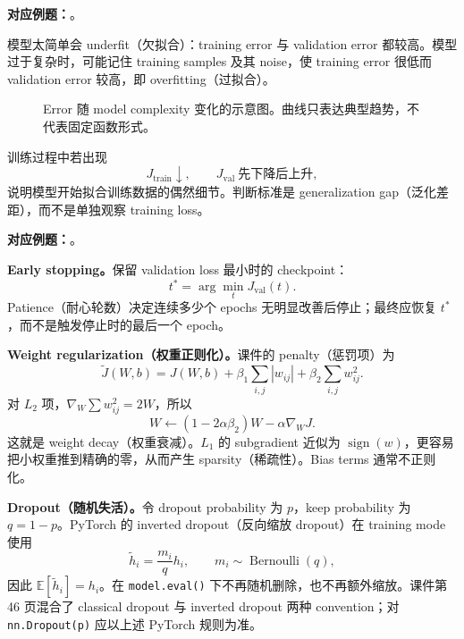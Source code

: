 \textbf{对应例题：}。


模型太简单会 underfit（欠拟合）：training error 与 validation error 都较高。模型过于复杂时，可能记住 training samples 及其 noise，使 training error 很低而 validation error 较高，即 overfitting（过拟合）。

\begin{figure}[htbp]
  \centering
  \resizebox{0.78\textwidth}{!}{}
  \caption{Error 随 model complexity 变化的示意图。曲线只表达典型趋势，不代表固定函数形式。}
  \label{fig:sc4001-l05-complexity-errors}
\end{figure}

训练过程中若出现
\[
  J_{\mathrm{train}}\downarrow,
  \qquad
  J_{\mathrm{val}}\ \text{先下降后上升},
\]
说明模型开始拟合训练数据的偶然细节。判断标准是 generalization gap（泛化差距），而不是单独观察 training loss。

\textbf{对应例题：}。


\textbf{Early stopping。}保留 validation loss 最小时的 checkpoint：
\[
  t^*=\arg\min_t J_{\mathrm{val}}(t).
\]
Patience（耐心轮数）决定连续多少个 epochs 无明显改善后停止；最终应恢复 $t^*$，而不是触发停止时的最后一个 epoch。

\textbf{Weight regularization（权重正则化）。}课件的 penalty（惩罚项）为
\[
  \widetilde J(W,b)
  =J(W,b)
  +\beta_1\sum_{i,j}|w_{ij}|
  +\beta_2\sum_{i,j}w_{ij}^2.
\]
对 $L_2$ 项，$\nabla_W\sum w_{ij}^2=2W$，所以
\[
  W\leftarrow
  (1-2\alpha\beta_2)W-\alpha\nabla_WJ.
\]
这就是 weight decay（权重衰减）。$L_1$ 的 subgradient 近似为 $\operatorname{sign}(w)$，更容易把小权重推到精确的零，从而产生 sparsity（稀疏性）。Bias terms 通常不正则化。

\textbf{Dropout（随机失活）。}令 dropout probability 为 $p$，keep probability 为 $q=1-p$。PyTorch 的 inverted dropout（反向缩放 dropout）在 training mode 使用
\[
  \widetilde h_i=\frac{m_i}{q}h_i,
  \qquad m_i\sim\operatorname{Bernoulli}(q),
\]
因此 $\mathbb E[\widetilde h_i]=h_i$。在 \texttt{model.eval()} 下不再随机删除，也不再额外缩放。课件第 46 页混合了 classical dropout 与 inverted dropout 两种 convention；对 \texttt{nn.Dropout(p)} 应以上述 PyTorch 规则为准。

